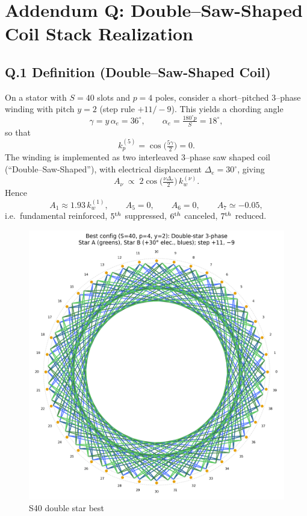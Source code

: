 \documentclass[10pt,reprint,aps,onecolumn,nofootinbib]{revtex4-2}
\def\mathcal#1{#1}%
\def\!{}%
\begin{document}
\section*{Addendum Q: Double--Saw-Shaped Coil Stack Realization}
\label{sec:addendumQ}

\subsection*{Q.1 Definition (Double--Saw-Shaped Coil)}
On a stator with $S=40$ slots and $p=4$ poles, consider a short--pitched
3--phase winding with pitch $y=2$ (step rule $+11/ -9$).
This yields a chording angle
\[
	\gamma = y\,\alpha_e = 36^\circ,
	\qquad
	\alpha_e = \tfrac{180^\circ p}{S} = 18^\circ,
\]
so that
\[
	k_p^{(5)}=\cos\!\big(\tfrac{5\gamma}{2}\big)=0.
\]
The winding is implemented as two interleaved 3--phase saw shaped coil (``Double--Saw-Shaped''),
with electrical displacement $\Delta_e=30^\circ$, giving
\[
	\mathcal A_\nu \;\propto\; 2\cos\!\Big(\tfrac{\nu\Delta_e}{2}\Big)\,k_w^{(\nu)}.
\]
Hence
\[
	\mathcal A_1 \approx 1.93\,k_w^{(1)},\qquad
	\mathcal A_5=0,\qquad
	\mathcal A_6=0,\qquad
	\mathcal A_7\simeq -0.05,
\]
i.e.\ fundamental reinforced, $5^{\textrm th}$ suppressed, $6^{\textrm th}$ canceled,
$7^{\textrm th}$ reduced.



\begin{figure}[htbp]
  \centering
  \includegraphics[width=0.7\linewidth]{S40_double_star_best.png}
  \caption{S40 double star best}
  \label{fig:s40-double-star-best}
\end{figure}
\end{document}
